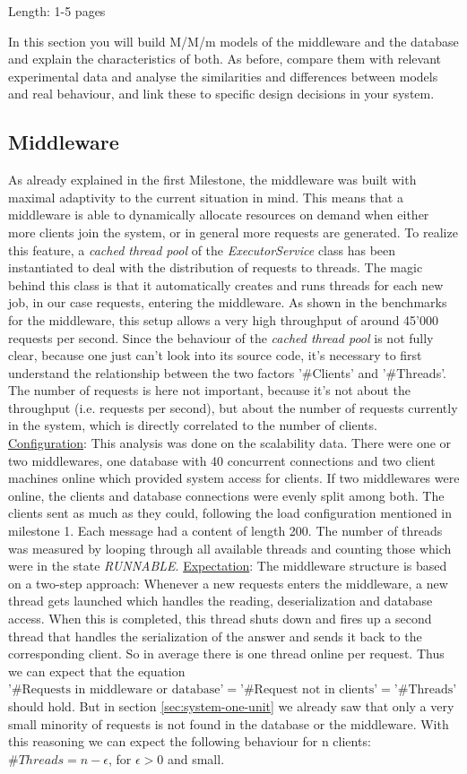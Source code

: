 \documentclass[11pt]{article}
\begin{document}
Length: 1-5 pages

In this section you will build M/M/m models of the middleware and the database and explain the characteristics of both. As before, compare them with relevant experimental data and analyse the similarities and differences between models and real behaviour, and link these to specific design decisions in your system.

\subsection{Middleware}
As already explained in the first Milestone, the middleware was built with maximal adaptivity to the current situation in mind. This means that a middleware is able to dynamically allocate resources on demand when either more clients join the system, or in general more requests are generated. To realize this feature, a \textit{cached thread pool} of the \textit{ExecutorService} class has been instantiated to deal with the distribution of requests to threads. The magic behind this class is that it automatically creates and runs threads for each new job, in our case requests, entering the middleware. As shown in the benchmarks for the middleware, this setup allows a very high throughput of around 45'000 requests per second. Since the behaviour of the \textit{cached thread pool} is not fully clear, because one just can't look into its source code, it's necessary to first understand the relationship between the two factors '\#Clients' and '\#Threads'. The number of requests is here not important, because it's not about the throughput (i.e. requests per second), but about the number of requests currently in the system, which is directly correlated to the number of clients.
\newline\underline{Configuration}: This analysis was done on the scalability data. There were one or two middlewares, one database with 40 concurrent connections and two client machines online which provided system access for clients. If two middlewares were online, the clients and database connections were evenly split among both. The clients sent as much as they could, following the load configuration mentioned in milestone 1. Each message had a content of length 200. The number of threads was measured by looping through all available threads and counting those which were in the state \textit{RUNNABLE}.
\newline\underline{Expectation}: The middleware structure is based on a two-step approach: Whenever a new requests enters the middleware, a new thread gets launched which handles the reading, deserialization and database access. When this is completed, this thread shuts down and fires up a second thread that handles the serialization of the answer and sends it back to the corresponding client. So in average there is one thread online per request. Thus we can expect that the equation $\text{'\#Requests in middleware or database'}=\text{'\#Request not in clients'}=\text{'\#Threads'}$ should hold. But in section \ref{sec:system-one-unit} we already saw that only a very small minority of requests is not found in the database or the middleware. With this reasoning we can expect the following behaviour for n clients: $\#Threads=n-\epsilon$, for $\epsilon>0$ and small.
\end{document}
